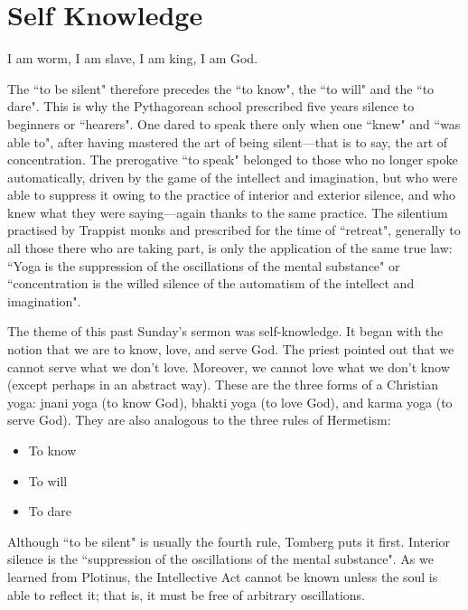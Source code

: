 \section{Self Knowledge}

\begin{quotex}
I am worm, I am slave, I am king, I am God. 

The ``to be silent" therefore precedes the ``to know", the ``to will" and the ``to dare". This is why the Pythagorean school
prescribed five years silence to beginners or ``hearers". One dared to speak there only when one ``knew" and ``was able
to", after having mastered the art of being silent—that is to say, the art of concentration. The
prerogative ``to speak" belonged to those who no longer spoke automatically, driven by the game of the intellect and
imagination, but who were able to suppress it owing to the practice of interior and exterior silence, and who knew what
they were saying—again thanks to the same practice. The silentium practised by Trappist monks and
prescribed for the time of ``retreat", generally to all those there who are taking part, is only the application of the
same true law: ``Yoga is the suppression of the oscillations of the mental substance" or ``concentration is the willed
silence of the automatism of the intellect and imagination". 

\end{quotex}
The theme of this past Sunday's sermon was self-knowledge. It began with the notion that we are to
know, love, and serve God. The priest pointed out that we cannot serve what we don't love.
Moreover, we cannot love what we don't know (except perhaps in an abstract way). These are the
three forms of a Christian yoga: jnani yoga (to know God), bhakti yoga (to love God), and karma yoga (to serve God).
They are also analogous to the three rules of Hermetism:

\begin{itemize}
\item To know 
\item To will 
\item To dare 
\end{itemize}
Although ``to be silent" is usually the fourth rule, Tomberg puts it first. Interior silence is the ``suppression of the
oscillations of the mental substance". As we learned from Plotinus, the Intellective Act cannot be known unless the
soul is able to reflect it; that is, it must be free of arbitrary oscillations.

